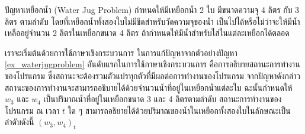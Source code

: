 \begin{example}
\label{ex_waterjugproblem}
ปัญหาเหยือกน้ำ (Water Jug Problem) 
 กำหนดให้มีเหยือกน้ำ 2 ใบ
มีขนาดความจุ 4 ลิตร กับ 3 ลิตร ตามลำดับ
โดยที่เหยือกน้ำทั้งสองใบไม่มีขีดสำหรับวัดความจุของน้ำ
เป็นไปได้หรือไม่ว่าจะให้มีน้ำเหลืออยู่จำนวน 2 ลิตรในเหยือกขนาด 4 ลิตร
ถ้ากำหนดให้มีน้ำสำหรับใส่ในแต่ละเหยือกได้ตลอด
\end{example}
%
\par{
เราจะเริ่มต้นด้วยการใช้ภาษาเชิงกระบวนการ 
ในการแก้ปัญหาจากตัวอย่างปัญหา \ref{ex_waterjugproblem} 
อันดับแรกในการใช้ภาษาเชิงกระบวนการ 
คือการอธิบายสถานะการทำงานของโปรแกรม 
ซึ่งสถานะจะต้องรวมตัวแปรทุกตัวที่มีผลต่อการทำงานของโปรแกรม
จากปัญหาดังกล่าวสถานะของการทำงานจะสามารถอธิบายได้ด้วยจำนวนน้ำที่อยู่ในเหยือกน้ำแต่ละใบ
ฉะนั้นกำหนดให้ $w_3$ และ $w_4$ 
เป็นปริมาณน้ำที่อยู่ในเหยือกขนาด 3 และ 4 ลิตรตามลำดับ
สถานะการทำงานของโปรแกรม ณ เวลา $t$ ใด ๆ 
สามารถอธิยายได้ด้วยปริมาณของน้ำในเหยือกทั้งสองใบในลักษณะเป็นลำดับดังนี้ 
$(w_3, w_4)_t$
}
%
